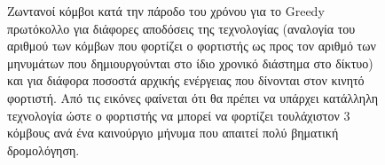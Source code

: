 \begin{figure}[H]
  \caption{Ζωντανοί κόμβοι κατά την πάροδο του χρόνου για το Greedy πρωτόκολλο για διάφορες αποδόσεις της τεχνολογίας (αναλογία του αριθμού των κόμβων που φορτίζει
ο φορτιστής ως προς τον αριθμό των μηνυμάτων που δημιουργούνται στο ίδιο χρονικό διάστημα στο δίκτυο) και για διάφορα ποσοστά αρχικής ενέργειας που δίνονται στον
κινητό φορτιστή. Από τις εικόνες φαίνεται ότι θα πρέπει να υπάρχει κατάλληλη τεχνολογία ώστε ο φορτιστής να μπορεί να φορτίζει τουλάχιστον 3 κόμβους ανά ένα
καινούργιο μήνυμα που απαιτεί πολύ βηματική δρομολόγηση.}
  \label{fig:1exp_3_1}
\end{figure}


\begin{figure}[H]
  \centering

\end{figure}

